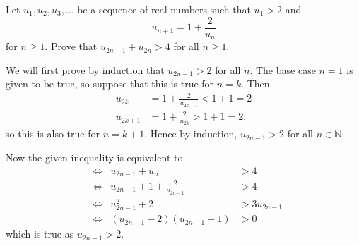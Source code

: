 \begin{question}
    Let $u_{1}, u_{2}, u_{3}, \ldots$ be a sequence of real numbers such that
    $u_{1} > 2$ and 
    \[u_{n + 1} = 1 + \frac{2}{u_{n}}\] 
    for $n \geq 1$. Prove that $u_{2n - 1} + u_{2n} > 4$ for all $n \geq 1$.
\end{question}
\begin{solution}
    We will first prove by induction that $u_{2n - 1} > 2$ for all $n$. The
    base case $n = 1$ is given to be true, so suppose that this is true for $n
    = k$. Then 
    \begin{align*}
        u_{2k} &= 1 + \frac{2}{u_{2k - 1}} < 1 + 1 = 2\\
        u_{2k + 1} &= 1 + \frac{2}{u_{2k}} > 1 + 1 = 2.
    \end{align*}
    so this is also true for $n = k + 1$. Hence by induction, $u_{2n - 1} > 2$
    for all $n \in \mathbb{N}$. 

    Now the given inequality is equivalent to
    \begin{align*}
        &\Longleftrightarrow& u_{2n - 1} + u_{n} &> 4\\
        &\Longleftrightarrow& u_{2n - 1} + 1 + \frac{2}{u_{2n - 1}} &> 4\\
        &\Longleftrightarrow& u_{2n - 1}^2 + 2 &> 3u_{2n - 1}\\[6.5pt]
        &\Longleftrightarrow& (u_{2n - 1} - 2)(u_{2n - 1} - 1) &> 0
    \end{align*}
    which is true as $u_{2n - 1} > 2$.
\end{solution}

